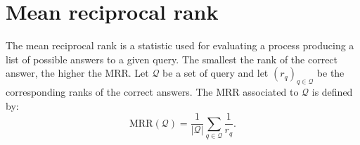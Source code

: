 \documentclass[a4paper]{article}
\begin{document}
\section{Mean reciprocal rank}
The mean reciprocal rank is a statistic used for evaluating a process producing a 
list of possible answers to a given query. The smallest the rank of the correct 
answer, the higher the MRR.
Let $\mathcal{Q}$ be a set of query and let $\left( r_q \right)_{q \in \mathcal{Q}}$ 
be the corresponding ranks of the correct answers. The MRR associated to $\mathcal{Q}$ 
is defined by:
\[
  \mathrm{MRR}(\mathcal{Q}) = \frac{1}{|\mathcal{Q}|} \sum_{q \in \mathcal{Q}} \frac{1}{r_q}.
\]
\end{document}

